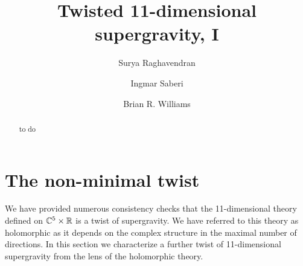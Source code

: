 \documentclass[11pt]{amsart}
\begin{document}
\title{Twisted 11-dimensional supergravity, I}
\author{Surya Raghavendran}
\address{Perimeter Institute for Theoretical Physics \\ 31 Caroline Street North \\ 
Waterloo, Ontario N2L 2Y5\\ Canada}
\author{Ingmar Saberi}
\address{Ludwig-Maximilians-Universit\"at M\"unchen \\ Fakult\"at f\"ur Physik \\ Theresienstra\ss{}e 37 \\ 80333 M\"unchen \\ Deutschland}
\author{Brian R. Williams}
\address{School of Mathematics \\ University of Edinburgh \\ Edinburgh EH9 3FD \\ Scotland}
\begin{abstract}
to do
\end{abstract}
\maketitle
\newpage 











\section{The non-minimal twist} 

We have provided numerous consistency checks that the 11-dimensional theory defined on $\mathbb C^5 \times \mathbb R$ is a twist of supergravity. 
We have referred to this theory as holomorphic as it depends on the complex structure in the maximal number of directions. 
In this section we characterize a further twist of 11-dimensional supergravity from the lens of the holomorphic theory. 
\end{document}
